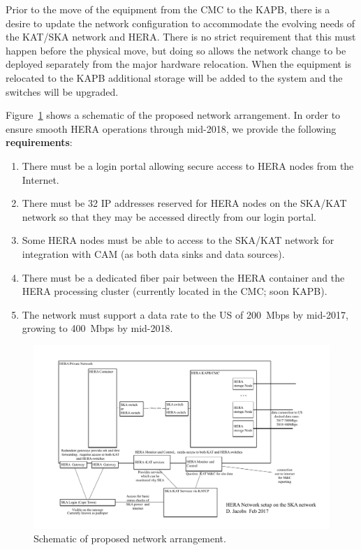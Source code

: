 \documentclass{article}
\begin{document}
Prior to the move of the equipment from the CMC to the KAPB, there is a desire
to update the network configuration to accommodate the evolving needs of the
KAT/SKA network and HERA.  There is no strict requirement that this must
happen before the physical move, but doing so allows the network change to be
deployed separately from the major hardware relocation.  When the equipment is relocated to the KAPB additional storage will be added to the system and the switches will be upgraded.

Figure~\ref{fig:net_org} shows a schematic of the proposed network arrangement. In order to ensure smooth HERA operations through mid-2018, we provide the following \textbf{requirements}:
\begin{enumerate}
\item There must be a login portal allowing secure access to HERA nodes from the Internet.
\item There must be 32 IP addresses reserved for HERA nodes on the SKA/KAT network so that they may be accessed directly from our login portal.
\item Some HERA nodes must be able to access to the SKA/KAT network for integration with CAM (as both data sinks and data sources).
\item There must be a dedicated fiber pair between the HERA container and the HERA processing cluster (currently located in the CMC; soon KAPB).
\item The network must support a data rate to the US of 200~Mbps by mid-2017, growing to 400~Mbps by mid-2018.
\end{enumerate}

\begin{figure}[H]
\includegraphics[width=\textwidth]{HERA_2017_network_organization.pdf}
\centering
\caption{Schematic of proposed network arrangement.}
\label{fig:net_org}
\end{figure}
\end{document}
